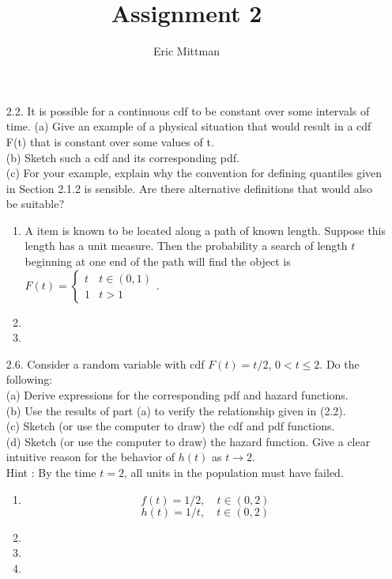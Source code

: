 \documentclass[12pt]{article}\usepackage[]{graphicx}\usepackage[]{color}
\author{Eric Mittman}
\title{Assignment 2}
\begin{document}
\maketitle
\begin{enumerate}
\item[2.2.] It is possible for a continuous cdf to be constant over some intervals of time.
(a) Give an example of a physical situation that would result in a cdf F(t) that is constant over some values of t.\\
(b) Sketch such a cdf and its corresponding pdf.\\
(c) For your example, explain why the convention for defining quantiles given in Section 2.1.2 is sensible. Are there alternative definitions that would also be suitable?\\
\begin{enumerate}
  \item
  A item is known to be located along a path of known length. Suppose this length has a unit measure. Then the probability a search of length $t$ beginning at one end of the path will find the object is $F(t) = \begin{cases}t & t\in (0,1)\\ 1 & t>1\end{cases}$.  
  \item
  \item
\end{enumerate}


\item[2.6.] Consider a random variable with cdf $F(t) = t/2$, $0 < t \le 2$. Do the following:\\
  (a) Derive expressions for the corresponding pdf and hazard functions.\\
(b) Use the results of part (a) to verify the relationship given in (2.2).\\
(c) Sketch (or use the computer to draw) the cdf and pdf functions.\\
(d) Sketch (or use the computer to draw) the hazard function. Give a clear intuitive reason for the behavior of $h(t)$ as $t  \rightarrow 2$.\\
Hint : By the time $t = 2$, all units in the population must have failed.
\begin{enumerate}
  \item \[f(t) = 1/2, \quad t\in (0,2)\]
  \[h(t) = 1/t, \quad t \in (0,2)\]
  \item 
  \item 
  \item 
  
\end{enumerate}
\end{enumerate}
\end{document}

